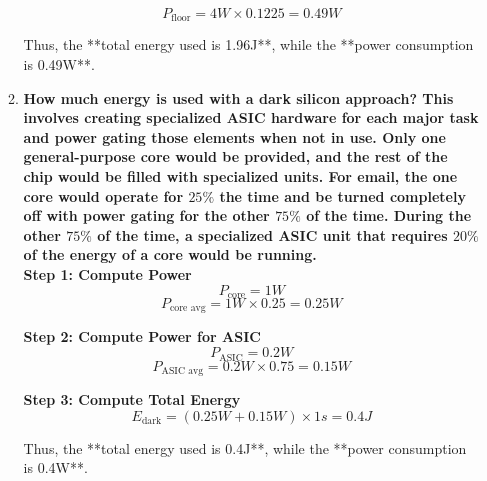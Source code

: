 \begin{enumerate}
\begin{enumerate}
                    \begin{equation*}
                        P_{\text{floor}} = 4W \times 0.1225 = 0.49W
                    \end{equation*}

                    Thus, the **total energy used is 1.96J**, while the **power consumption is 0.49W**.

              \item \textbf{How much energy is used with a dark silicon approach? This involves creating specialized ASIC hardware for each major task and power gating those elements when not in use. Only one general-purpose core would be provided, and the rest of the chip would be filled with specialized units. For email, the one core would operate for $25\%$ the time and be turned completely off with power gating for the other $75\%$ of the time. During the other $75\%$ of the time, a specialized ASIC unit that requires $20\%$ of the energy of a core would be running.} \\

                    \textbf{Step 1: Compute Power}
                    \begin{equation*}
                        P_{\text{core}} = 1W
                    \end{equation*}
                    \begin{equation*}
                        P_{\text{core avg}} = 1W \times 0.25 = 0.25W
                    \end{equation*}

                    \textbf{Step 2: Compute Power for ASIC}
                    \begin{equation*}
                        P_{\text{ASIC}} = 0.2W
                    \end{equation*}
                    \begin{equation*}
                        P_{\text{ASIC avg}} = 0.2W \times 0.75 = 0.15W
                    \end{equation*}

                    \textbf{Step 3: Compute Total Energy}
                    \begin{equation*}
                        E_{\text{dark}} = (0.25W + 0.15W) \times 1s = 0.4J
                    \end{equation*}

                    Thus, the **total energy used is 0.4J**, while the **power consumption is 0.4W**.
          \end{enumerate}


\end{enumerate}
